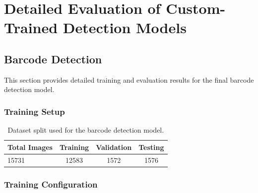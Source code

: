 
\chapter{Detailed Evaluation of Custom-Trained Detection Models}
\label{app:custom_model_evaluation}

\section{Barcode Detection}
\label{app:barcode_detection}
This section provides detailed training and evaluation results for the final
barcode detection model.

\subsection{Training Setup}

\begin{table}[H]
\centering
\begin{tabular}{lccc}
\toprule
Total Images & Training & Validation & Testing \\
\midrule
15731 & 12583 & 1572 & 1576 \\
\bottomrule
\end{tabular}
\caption{Dataset split used for the barcode detection model.}
\label{tab:bc_training_split}
\end{table}

\subsection{Training Configuration}


